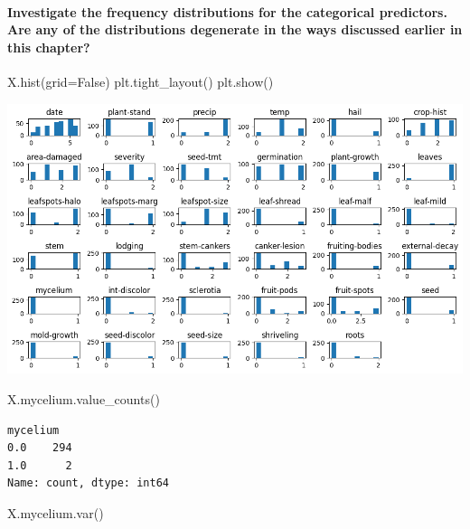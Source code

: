 \documentclass[
  11pt,
]{article}
\let\oldparagraph\paragraph
\renewcommand{\paragraph}[1]{\oldparagraph{#1}\mbox{}}
\newenvironment{Shaded}{\begin{snugshade}}{\end{snugshade}}
\newcommand{\NormalTok}[1]{\textcolor[rgb]{0.00,0.23,0.31}{#1}}
\newcommand{\OperatorTok}[1]{\textcolor[rgb]{0.37,0.37,0.37}{#1}}
\newcommand{\VariableTok}[1]{\textcolor[rgb]{0.07,0.07,0.07}{#1}}
\begin{document}
\paragraph{Investigate the frequency distributions for the categorical
predictors. Are any of the distributions degenerate in the ways
discussed earlier in this
chapter?}\label{investigate-the-frequency-distributions-for-the-categorical-predictors.-are-any-of-the-distributions-degenerate-in-the-ways-discussed-earlier-in-this-chapter}

\begin{Shaded}
\begin{Highlighting}[]
\NormalTok{X.hist(grid}\OperatorTok{=}\VariableTok{False}\NormalTok{)}
\NormalTok{plt.tight\_layout()}
\NormalTok{plt.show()}
\end{Highlighting}
\end{Shaded}

\includegraphics{hw4_files/figure-pdf/cell-15-output-1.png}

\begin{Shaded}
\begin{Highlighting}[]
\NormalTok{X.mycelium.value\_counts()}
\end{Highlighting}
\end{Shaded}

\begin{verbatim}
mycelium
0.0    294
1.0      2
Name: count, dtype: int64
\end{verbatim}

\begin{Shaded}
\begin{Highlighting}[]
\NormalTok{X.mycelium.var()}
\end{Highlighting}
\end{Shaded}
\end{document}
